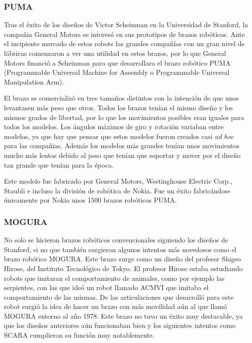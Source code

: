 \subsubsection{PUMA}

Tras el éxito de los diseños de Victor Scheinman en la Universidad de Stanford, la compañia General Motors se interesó en sus prototipos de brazos robóticos. Ante el incipiente mercado de estos robots las grandes compañías con un gran nivel de fábricas comenzaron a ver una utilidad en estos brazos, por lo que General Motors financió a Scheinman para que desarrollara el brazo robótico PUMA (Programmable Universal Machine for Assembly o Programmable Universal Manipulation Arm).

El brazo se comercializó en tres tamaños distintos con la intención de que unos levantasen más peso que otros. Todos los brazos tenían el mismo diseño y los mismos grados de libertad, por lo que los movimientos posibles eran iguales para todos los modelos. Los ángulos máximos de giro y rotación variaban entre modelos, ya que hay que pensar que estos modelos fueron creados casi \textit{ad hoc} para las compañias. Además los modelos más grandes tenían unos movimientos mucho más lentos debido al peso que tenían que soportar y mover por el diseño tan grande que tenían para la época.

Este modelo fue fabricado por General Motors, Westinghouse Electric Corp., Staubli e incluso la división de robótica de Nokia. Fue un éxito fabricándose únicamente por Nokia unos 1500 brazos robóticos PUMA.

\subsubsection{MOGURA}

No solo se hicieron brazos robóticos convencionales siguiendo los diseños de Stanford, si no que también surgieron algunos intentos más novedosos como el brazo robótico MOGURA. Este brazo surge como un diseño del profesor Shigeo Hirose, del Instituto Tecnológico de Tokyo. El profesor Hirose estaba estudiando robots que imitaran el comportamiento de animales, como por ejemplo las serpientes, con las que ideó un robot llamado ACMVI que imitaba el comportamiento de las mismas. De las articulaciones que desarrolló para este robot surgió la idea de hacer un brazo con más movilidad aún al que llamó MOGURA entorno al año 1978. Este brazo no tuvo un éxito muy destacable, ya que los diseños anteriores aún funcionaban bien y los siguientes intentos como SCARA cumplieron su función muy notablemente.

